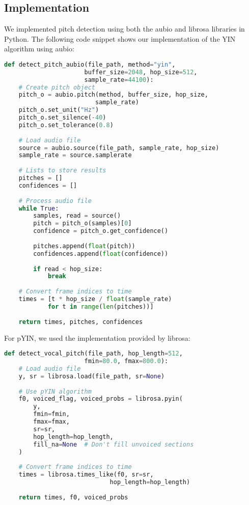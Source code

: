 \documentclass[conference]{IEEEtran}
\begin{document}
\subsection{Implementation}
We implemented pitch detection using both the aubio and librosa libraries in Python. The following code snippet shows our implementation of the YIN algorithm using aubio:

\begin{lstlisting}[language=Python]
def detect_pitch_aubio(file_path, method="yin", 
                      buffer_size=2048, hop_size=512, 
                      sample_rate=44100):
    # Create pitch object
    pitch_o = aubio.pitch(method, buffer_size, hop_size, 
                         sample_rate)
    pitch_o.set_unit("Hz")
    pitch_o.set_silence(-40)
    pitch_o.set_tolerance(0.8)
    
    # Load audio file
    source = aubio.source(file_path, sample_rate, hop_size)
    sample_rate = source.samplerate
    
    # Lists to store results
    pitches = []
    confidences = []
    
    # Process audio file
    while True:
        samples, read = source()
        pitch = pitch_o(samples)[0]
        confidence = pitch_o.get_confidence()
        
        pitches.append(float(pitch))
        confidences.append(float(confidence))
        
        if read < hop_size:
            break
    
    # Convert frame indices to time
    times = [t * hop_size / float(sample_rate) 
            for t in range(len(pitches))]
    
    return times, pitches, confidences
\end{lstlisting}

For pYIN, we used the implementation provided by librosa:

\begin{lstlisting}[language=Python]
def detect_vocal_pitch(file_path, hop_length=512, 
                      fmin=80.0, fmax=800.0):
    # Load audio file
    y, sr = librosa.load(file_path, sr=None)
    
    # Use pYIN algorithm
    f0, voiced_flag, voiced_probs = librosa.pyin(
        y, 
        fmin=fmin,
        fmax=fmax,
        sr=sr,
        hop_length=hop_length,
        fill_na=None  # Don't fill unvoiced sections
    )
    
    # Convert frame indices to time
    times = librosa.times_like(f0, sr=sr, 
                             hop_length=hop_length)
    
    return times, f0, voiced_probs
\end{lstlisting}
\end{document}
